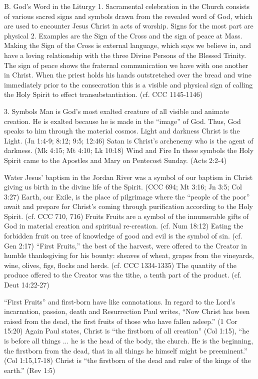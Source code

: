 \documentclass[oneside]{book}
\begin{document}
B. God's Word in the Liturgy
1. Sacramental celebration in the Church consists of various sacred signs and
symbols drawn from the revealed word of God, which are used to encounter Jesus
Christ in acts of worship.
Signs for the most part are physical
2. Examples are the Sign of the Cross and the sign of peace at Mass. Making the
Sign of the Cross is external language, which says we believe in, and have a
loving relationship with the three Divine Persons of the Blessed Trinity. The
sign of peace shows the fraternal communication we have with one another in
Christ. When the priest holds his hands outstretched over the bread and wine
immediately prior to the consecration this is a visible and physical sign of
calling the Holy Spirit to effect transubstantiation. (cf. CCC 1145-1146)

3. Symbols
Man is God's most exalted creature of all visible and animate creation. He is
exalted because he is made in the ``image'' of God. Thus, God speaks to him
through the material cosmos.
Light and darkness
Christ is the Light. (Jn 1:4-9; 8:12; 9:5; 12:46) Satan is Christ's archenemy
who is the agent of darkness. (Mk 4:15; Mt 4:10; Lk 10:18)
Wind and Fire
In these symbols the Holy Spirit came to the Apostles and Mary on Pentecost
Sunday. (Acts 2:2-4)

Water
Jesus' baptism in the Jordan River was a symbol of our baptism in Christ giving
us birth in the divine life of the Spirit. (CCC 694; Mt 3:16; Jn 3:5; Col 3:27)
Earth, our Exile, is the place of pilgrimage where the ``people of the poor''
await and prepare for Christ's coming through purification according to the Holy
Spirit. (cf. CCC 710, 716)
Fruits
Fruits are a symbol of the innumerable gifts of God in material creation and
spiritual re-creation. (cf. Num 18:12) Eating the forbidden fruit on tree of
knowledge of good and evil is the symbol of sin. (cf. Gen 2:17)
``First Fruits,'' the best of the harvest, were offered to the Creator in humble
thanksgiving for his bounty: sheaves of wheat, grapes from the vineyards, wine,
olives, figs, flocks and herds. (cf. CCC 1334-1335) The quantity of the produce
offered to the Creator was the tithe, a tenth part of the product. (cf. Deut 14:22-27)

``First Fruits'' and first-born have like connotations. In regard to the Lord's
incarnation, passion, death and Resurrection Paul writes, ``Now Christ has been
raised from the dead, the first fruits of those who have fallen asleep.'' (1 Cor
15:20) Again Paul states, Christ is ``the firstborn of all creation'' (Col
1:15), ``he is before all things ... he is the head of the body, the church. He
is the beginning, the firstborn from the dead, that in all things he himself
might be preeminent.'' (Col 1:15,17-18) Christ is ``the firstborn of the dead
and ruler of the kings of the earth.'' (Rev 1:5)
\end{document}
